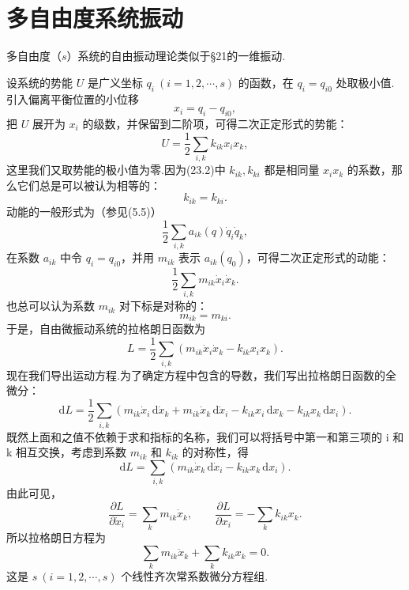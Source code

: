 \section{多自由度系统振动}

多自由度（$s$）系统的自由振动理论类似于§21的一维振动.

设系统的势能 $U$ 是广义坐标 $q_i\ (i=1,2,\cdots,s)$ 的函数，在 $q_i=q_{i0}$ 处取极小值.引入偏离平衡位置的小位移
\begin{equation}
  x_i=q_i-q_{i0},
\end{equation}
把 $U$ 展开为 $x_i$ 的级数，并保留到二阶项，可得二次正定形式的势能：
\begin{equation}
  U=\frac{1}{2}\sum_{i,k}k_{ik}x_ix_k,
\end{equation}
这里我们又取势能的极小值为零.因为(23.2)中 $k_{ik},k_{ki}$ 都是相同量 $x_ix_k$ 的系数，那么它们总是可以被认为相等的：
\begin{equation*}
  k_{ik}=k_{ki}.
\end{equation*}
动能的一般形式为（参见(5.5)）
\begin{equation*}
  \frac{1}{2}\sum_{i,k}a_{ik}(q)\dot{q}_i\dot{q}_k,
\end{equation*}
在系数 $a_{ik}$ 中令 $q_i=q_{i0}$，并用 $m_{ik}$ 表示 $a_{ik}(q_0)$，可得二次正定形式的动能：
\begin{equation}
  \frac{1}{2}\sum_{i,k}m_{ik}\dot{x}_i\dot{x}_k.
\end{equation}
也总可以认为系数 $m_{ik}$ 对下标是对称的：
\begin{equation*}
  m_{ik}=m_{ki}.
\end{equation*}
于是，自由微振动系统的拉格朗日函数为
\begin{equation}
  L=\frac{1}{2}\sum_{i,k}\left(m_{ik}\dot{x}_i\dot{x}_k-k_{ik}x_ix_k\right).
\end{equation}
现在我们导出运动方程.为了确定方程中包含的导数，我们写出拉格朗日函数的全微分：
\begin{equation*}
  \mathrm{d}L=\frac{1}{2}\sum_{i,k}\left(m_{ik}\dot{x}_i\,\mathrm{d}\dot{x}_k
  +m_{ik}\dot{x}_k\,\mathrm{d}\dot{x}_i
  -k_{ik}x_i\,\mathrm{d}x_k-k_{ik}x_k\,\mathrm{d}x_i\right).
\end{equation*}
既然上面和之值不依赖于求和指标的名称，我们可以将括号中第一和第三项的 i 和 k 相互交换，考虑到系数 $m_{ik}$ 和 $k_{ik}$ 的对称性，得
\begin{equation*}
  \mathrm{d}L=\sum_{i,k}\left(m_{ik}\dot{x}_k\,\mathrm{d}\dot{x}_i-k_{ik}x_k\,\mathrm{d}x_i\right).
\end{equation*}
由此可见，
\begin{equation*}
  \frac{\partial L}{\partial\dot{x}_i}=\sum_km_{ik}\dot{x}_k,\qquad
  \frac{\partial L}{\partial x_i}=-\sum_kk_{ik}x_k.
\end{equation*}
所以拉格朗日方程为
\begin{equation}
  \sum_km_{ik}\ddot{x}_k+\sum_kk_{ik}x_k=0.
\end{equation}
这是 $s\ (i=1,2,\cdots,s)$ 个线性齐次常系数微分方程组.

